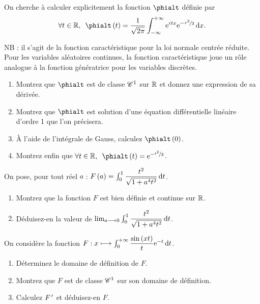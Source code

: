 \begin{exoss}
On cherche à calculer explicitement la fonction \(\phialt\) définie par \[\quantifs{\forall t\in\R}\phialt\paren{t}=\dfrac{1}{\sqrt{2\pi}}\int_{\minf}^{\pinf}\e{\i tx}\e{-\nicefrac{x^2}{2}}\odif{x}.\]

NB : il s'agit de la fonction caractéristique pour la loi normale centrée réduite. Pour les variables aléatoires continues, la fonction caractéristique joue un rôle analogue à la fonction génératrice pour les variables discrètes.

\begin{enumerate}
    \item Montrez que \(\phialt\) est de classe \(\mathscr{C}^{1}\) sur \(\mathbb{R}\) et donnez une expression de sa dérivée. \\
    \item Montrez que \(\phialt\) est solution d'une équation différentielle linéaire d'ordre 1 que l'on précisera. \\
    \item À l'aide de l'intégrale de Gauss, calculez \(\phialt\paren{0}\). \\
    \item Montrez enfin que \(\quantifs{\forall t\in\R}\phialt\paren{t}=\e{-\nicefrac{t^2}{2}}\).
\end{enumerate}
\end{exoss}

\begin{exoss}
On pose, pour tout réel \(a\) : \(F\paren{a}=\int_0^1\dfrac{t^2}{\sqrt{1+a^4t^2}}\odif{t}\).

\begin{enumerate}
    \item Montrez que la fonction \(F\) est bien définie et continue sur \(\mathbb{R}\). \\
    \item Déduisez-en la valeur de \(\lim_{a\to0}\int_0^1\dfrac{t^2}{\sqrt{1+a^4t^2}}\odif{t}\).
\end{enumerate}
\end{exoss}

\begin{exoss}
On considère la fonction \(F:x\mapsto\int_0^{\pinf}\dfrac{\sin\paren{xt}}{t}\e{-t}\odif{t}\).

\begin{enumerate}
    \item Déterminez le domaine de définition de \(F\). \\
    \item Montrez que \(F\) est de classe \(\mathscr{C}^{1}\) sur son domaine de définition. \\
    \item Calculez \(F^{\,\prime}\) et déduisez-en \(F\).
\end{enumerate}
\end{exoss}

